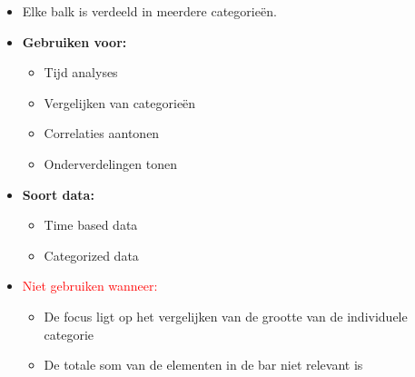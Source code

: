 \documentclass{article}
\newcommand{\bold}[1]{\textbf{#1}}
\begin{document}
\begin{itemize}
    \item Elke balk is verdeeld in meerdere categorieën.
    \item \bold{Gebruiken voor:}
    \begin{itemize}
        \item Tijd analyses
        \item Vergelijken van categorieën
        \item Correlaties aantonen
        \item Onderverdelingen tonen
    \end{itemize}
    \item \bold{Soort data:}
    \begin{itemize}
        \item Time based data
        \item Categorized data
    \end{itemize}
    \item \textcolor{red}{Niet gebruiken wanneer:}
    \begin{itemize}
        \item De focus ligt op het vergelijken van de grootte van de individuele categorie
        \item De totale som van de elementen in de bar niet relevant is
    \end{itemize}
\end{itemize}
\end{document}
